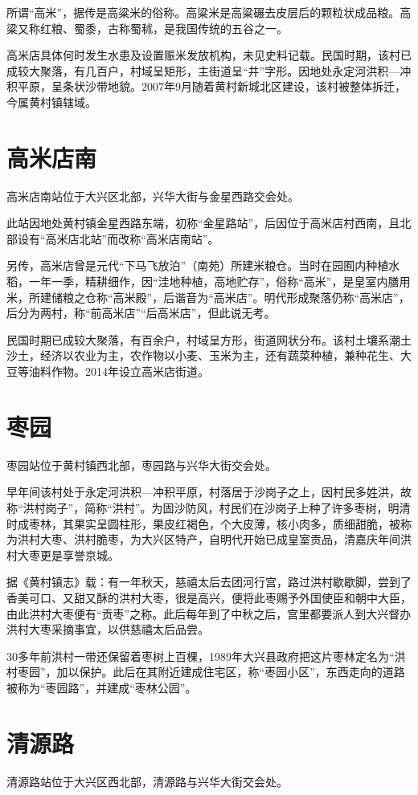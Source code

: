 所谓“高米”，据传是高粱米的俗称。高粱米是高粱碾去皮层后的颗粒状成品粮。高粱又称红粮、蜀黍，古称蜀秫，是我国传统的五谷之一。

高米店具体何时发生水患及设置赈米发放机构，未见史料记载。民国时期，该村已成较大聚落，有几百户，村域呈矩形，主街道呈“井”字形。因地处永定河洪积—冲积平原，呈条状沙带地貌。2007年9月随着黄村新城北区建设，该村被整体拆迁，今属黄村镇辖域。

\section{高米店南}
高米店南站位于大兴区北部，兴华大街与金星西路交会处。

此站因地处黄村镇金星西路东端，初称“金星路站”，后因位于高米店村西南，且北部设有“高米店北站”而改称“高米店南站”。

另传，高米店曾是元代“下马飞放泊”（南苑）所建米粮仓。当时在园囿内种植水稻，一年一季，精耕细作，因“洼地种植，高地贮存”，俗称“高米”，是皇室内膳用米，所建储粮之仓称“高米殿”，后谐音为“高米店”。明代形成聚落仍称“高米店”，后分为两村，称“前高米店”“后高米店”，但此说无考。

民国时期已成较大聚落，有百余户，村域呈方形，街道网状分布。该村土壤系潮土沙土，经济以农业为主，农作物以小麦、玉米为主，还有蔬菜种植，兼种花生、大豆等油料作物。2014年设立高米店街道。

\section{枣园}
枣园站位于黄村镇西北部，枣园路与兴华大街交会处。

早年间该村处于永定河洪积—冲积平原，村落居于沙岗子之上，因村民多姓洪，故称“洪村岗子”，简称“洪村”。为固沙防风，村民们在沙岗子上种了许多枣树，明清时成枣林，其果实呈圆柱形，果皮红褐色，个大皮薄，核小肉多，质细甜脆，被称为洪村大枣、洪村脆枣，为大兴区特产，自明代开始已成皇室贡品，清嘉庆年间洪村大枣更是享誉京城。

据《黄村镇志》载：有一年秋天，慈禧太后去团河行宫，路过洪村歇歇脚，尝到了香美可口、又甜又酥的洪村大枣，很是高兴，便将此枣赐予外国使臣和朝中大臣，由此洪村大枣便有“贡枣”之称。此后每年到了中秋之后，宫里都要派人到大兴督办洪村大枣采摘事宜，以供慈禧太后品尝。

30多年前洪村一带还保留着枣树上百棵，1989年大兴县政府把这片枣林定名为“洪村枣园”，加以保护。此后在其附近建成住宅区，称“枣园小区”，东西走向的道路被称为“枣园路”，并建成“枣林公园”。

\section{清源路}
清源路站位于大兴区西北部，清源路与兴华大街交会处。

